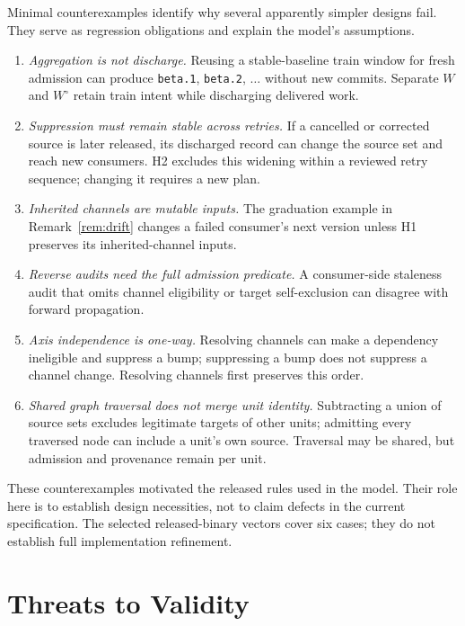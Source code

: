 \documentclass[10pt,conference]{IEEEtran}
\theoremstyle{definition}
\newcommand{\code}[1]{\texttt{#1}}
\begin{document}
Minimal counterexamples identify why several apparently simpler designs fail.
They serve as regression obligations and explain the model's assumptions.

\begin{enumerate}
  \item \emph{Aggregation is not discharge.} Reusing a stable-baseline
    train window for fresh admission can produce \code{beta.1},
    \code{beta.2}, $\ldots$ without new commits. Separate $W$ and
    $W^\circ$ retain train intent while discharging delivered work.
  \item \emph{Suppression must remain stable across retries.} If a
    cancelled or corrected source is later released, its discharged record
    can change the source set and reach new consumers. H2 excludes this
    widening within a reviewed retry sequence; changing it requires a new plan.
  \item \emph{Inherited channels are mutable inputs.} The graduation
    example in Remark~\ref{rem:drift} changes a failed consumer's next version
    unless H1 preserves its inherited-channel inputs.
  \item \emph{Reverse audits need the full admission predicate.} A
    consumer-side staleness audit that omits channel eligibility or target
    self-exclusion can disagree with forward propagation.
  \item \emph{Axis independence is one-way.} Resolving channels can make a
    dependency ineligible and suppress a bump; suppressing a bump does not
    suppress a channel change. Resolving channels first preserves this order.
  \item \emph{Shared graph traversal does not merge unit identity.}
    Subtracting a union of source sets excludes legitimate targets of other
    units; admitting every traversed node can include a unit's own source.
    Traversal may be shared, but admission and provenance remain per unit.
\end{enumerate}

These counterexamples motivated the released rules used in the model. Their
role here is to establish design necessities, not to claim defects in the
current specification. The selected released-binary vectors cover six cases;
they do not establish full implementation refinement.

\section{Threats to Validity}
\label{sec:threats}
\end{document}
